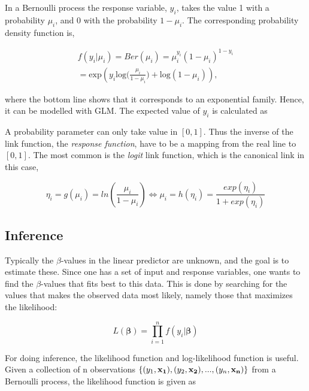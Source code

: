 In a Bernoulli process the response variable, $y_i$, takes the value 1 with a probability $\mu_i$, and 0 with the probability $1-\mu_i$. The corresponding probability density function is,

\begin{equation}
\begin{split}
    f(y_i|\mu_i) = Ber(\mu_i) = \mu_i^{y_i}(1-\mu_i)^{1-y_i}\\
    = \text{exp} ( y_i  \text{log}\big(\frac{\mu_i}{1-\mu_i}\big) + \text{log}(1-\mu_i)),
\end{split}
\end{equation}

where the bottom line shows that it corresponds to an exponential family. Hence, it can be modelled with GLM. The expected value of $y_i$ is calculated as

A probability parameter can only take value in $[0,1]$. Thus the inverse of the link function, the \textit{response function}, have to be a mapping from the real line to $[0,1]$. The most common is the \textit{logit} link function, which is the canonical link in this case,

\begin{equation}
    \eta_i = g(\mu_i) = ln(\frac{\mu_i}{1-\mu_i}) \Leftrightarrow 
    \mu_i = h(\eta_i) = \frac{exp(\eta_i)}{1+exp(\eta_i)}
\end{equation}


\subsection{Inference}
\label{sec:Inference}

Typically the $\beta$-values in the linear predictor are unknown, and the goal is to estimate these. Since one has a set of input and response variables, one wants to find the $\beta$-values that fits best to this data. This is done by searching for the values that makes the observed data most likely, namely those that maximizes the likelihood:

\begin{equation}
    L(\bm{\beta}) = \prod_{i=1}^{n} f(y_i |\bm{ \beta})
\end{equation}





For doing inference, the likelihood function and log-likelihood function is useful. Given a collection of n observations $\{(y_1, {\bf x_1}), (y_2, {\bf x_2}),...,(y_n, {\bf x_n})\}$ from a Bernoulli process, the likelihood function is given as

